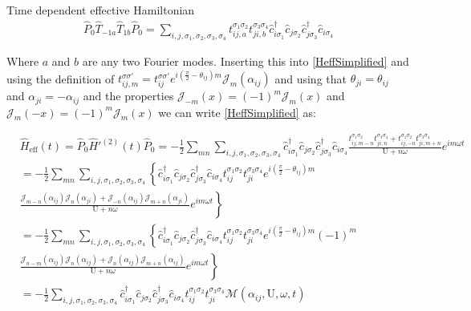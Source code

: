 \begin{section}{Time dependent effective Hamiltonian}
\begin{align*}
\hat{P}_0 \hat{T}_{-1a} \hat{T}_{1b} \hat{P}_0 = \sum_{i,j, \sigma_1, \sigma_2, \sigma_3, \sigma_4} t_{ij,a}^{\sigma_1 \sigma_2} t_{ji,b}^{\sigma_3 \sigma_4} \hat{c}_{i \sigma_1}^\dagger \hat{c}_{j \sigma_2} \hat{c}_{j \sigma_3}^\dagger \hat{c}_{i \sigma_4}
\end{align*}

Where $a$ and $b$ are any two Fourier modes. Inserting this into \ref{HeffSimplified} and using the definition of $t_{ij,m}^{\sigma \sigma'} = t_{ij}^{\sigma \sigma'} e^{i(\frac{\pi}{2}-\theta_{ij})m} \mathcal{J}_m(\alpha_{ij})$ and using that $\theta_{ji} = \theta_{ij}$ and $\alpha_{ji} = -\alpha_{ij}$ and the properties $\mathcal{J}_{-m}(x) = (-1)^m\mathcal{J}_m(x)$ and $\mathcal{J}_m(-x) = (-1)^m\mathcal{J}_m(x)$ we can write \ref{HeffSimplified} as:

\begin{align}
&\hat{H}_{\text{eff}}(t) = \hat{P}_0\hat{H}'^{(2)}(t)\hat{P}_0 = - \frac{1}{2}\sum_{mn} \sum_{i,j, \sigma_1, \sigma_2, \sigma_3, \sigma_4}\hat{c}_{i \sigma_1}^\dagger \hat{c}_{j \sigma_2} \hat{c}_{j \sigma_3}^\dagger \hat{c}_{i \sigma_4} \frac{t_{ij,m-n}^{\sigma_1 \sigma_2} t_{ji,n}^{\sigma_3 \sigma_4} + t_{ij,-n}^{\sigma_1 \sigma_2} t_{ji,m+n}^{\sigma_3 \sigma_4}}{\text{U}+n\omega} e^{im\omega t} \nonumber \\
&= - \frac{1}{2}\sum_{mn} \sum_{i,j, \sigma_1, \sigma_2, \sigma_3, \sigma_4} \left\{ \hat{c}_{i \sigma_1}^\dagger \hat{c}_{j \sigma_2} \hat{c}_{j \sigma_3}^\dagger \hat{c}_{i \sigma_4} t_{ij}^{\sigma_1 \sigma_2} t_{ji}^{\sigma_3 \sigma_4} e^{i(\frac{\pi}{2}-\theta_{ij})m} \right. \nonumber \\
& \left. \frac{ \mathcal{J}_{m-n}(\alpha_{ij}) \mathcal{J}_{n}(\alpha_{ji}) + \mathcal{J}_{-n}(\alpha_{ij}) \mathcal{J}_{m+n}(\alpha_{ji})}{\text{U}+n\omega} e^{im\omega t} \right\} \nonumber \\
&= - \frac{1}{2}\sum_{mn} \sum_{i,j, \sigma_1, \sigma_2, \sigma_3, \sigma_4} \left\{ \hat{c}_{i \sigma_1}^\dagger \hat{c}_{j \sigma_2} \hat{c}_{j \sigma_3}^\dagger \hat{c}_{i \sigma_4} t_{ij}^{\sigma_1 \sigma_2} t_{ji}^{\sigma_3 \sigma_4} e^{i(\frac{\pi}{2}-\theta_{ij})m} (-1)^m \right. \nonumber \\
&\left. \frac{ \mathcal{J}_{n-m}(\alpha_{ij}) \mathcal{J}_{n}(\alpha_{ij}) + \mathcal{J}_{n}(\alpha_{ij}) \mathcal{J}_{m+n}(\alpha_{ij})}{\text{U}+n\omega} e^{im\omega t} \right\} \nonumber \\
&= - \frac{1}{2} \sum_{i,j, \sigma_1, \sigma_2, \sigma_3, \sigma_4}\hat{c}_{i \sigma_1}^\dagger \hat{c}_{j \sigma_2} \hat{c}_{j \sigma_3}^\dagger \hat{c}_{i \sigma_4} t_{ij}^{\sigma_1 \sigma_2} t_{ji}^{\sigma_3 \sigma_4} \mathcal{M}(\alpha_{ij}, \text{U}, \omega, t) \label{HeffSimplified}
\end{align}


\end{section}
